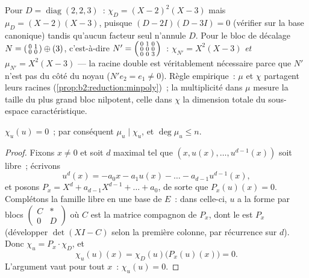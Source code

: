 \begin{example}\label{ex:b2:reduction:minvschar}
Pour $D = \operatorname{diag}(2, 2, 3)$~: $\chi_D = (X - 2)^2(X - 3)$
mais $\mu_D = (X - 2)(X - 3)$, puisque $(D - 2I)(D - 3I) = 0$
(vérifier sur la base canonique) tandis qu'aucun facteur seul n'annule
$D$. Pour le bloc de décalage $N = \begin{psmallmatrix}0 & 1\\ 0 &
0\end{psmallmatrix} \oplus (3)$, c'est-à-dire $N' =
\begin{psmallmatrix}0 & 1 & 0\\ 0 & 0 & 0\\ 0 & 0 &
3\end{psmallmatrix}$~: $\chi_{N'} = X^2(X - 3)$ \emph{et} $\mu_{N'} =
X^2(X - 3)$ --- la racine double est véritablement nécessaire parce
que $N'$ n'est pas  du côté du noyau ($N'e_2 = e_1 \neq
0$). Règle empirique~: $\mu$ et $\chi$ partagent leurs racines
(\cref{prop:b2:reduction:minpoly})~; la multiplicité dans $\mu$ mesure
la taille du plus grand bloc nilpotent, celle dans $\chi$ la dimension
totale du sous-espace caractéristique.
\end{example}

\begin{theorem}\label{thm:b2:reduction:cayleyhamilton}
$\chi_u(u) = 0$~; par conséquent $\mu_u \mid \chi_u$, et $\deg \mu_u
\leq n$.
\end{theorem}

\begin{proof}
Fixons $x \neq 0$ et soit $d$ maximal tel que $(x, u(x), \dots,
u^{d-1}(x))$ soit libre~; écrivons
\[
u^d(x) = -a_0 x - a_1 u(x) - \dots - a_{d-1}u^{d-1}(x),
\]
et posons $P_x = X^d + a_{d-1}X^{d-1} + \dots + a_0$, de sorte que
$P_x(u)(x) = 0$. Complétons la famille libre en une base de $E$~: dans
celle-ci, $u$ a la forme par blocs $\begin{pmatrix} C & \ast\\ 0 &
D\end{pmatrix}$ où $C$ est la matrice compagnon de $P_x$, dont le
 est $P_x$ (développer $\det(XI - C)$ selon la
première colonne, par récurrence sur $d$). Donc $\chi_u = P_x \cdot
\chi_D$, et
\[
\chi_u(u)(x) = \chi_D(u)\bigl(P_x(u)(x)\bigr) = 0 .
\]
L'argument vaut pour tout $x$~: $\chi_u(u) = 0$.
\end{proof}

